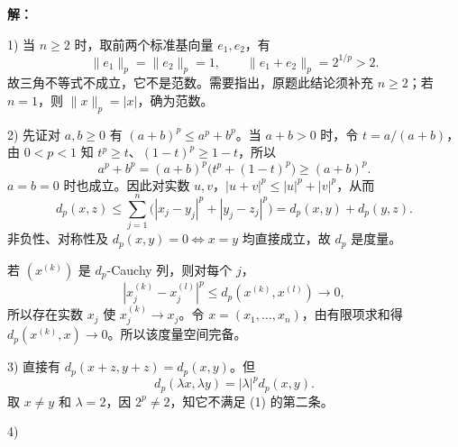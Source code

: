 \documentclass{article}
\begin{document}
\par{}\noindent\textbf{解：}\par\nopagebreak[4]



1) 当 $n\ge2$ 时，取前两个标准基向量 $e_1,e_2$，有
\[
\|e_1\|_p=\|e_2\|_p=1,\qquad
\|e_1+e_2\|_p=2^{1/p}>2.
\]
故三角不等式不成立，它不是范数。需要指出，原题此结论须补充 $n\ge2$；若 $n=1$，则 $\|x\|_p=|x|$，确为范数。

2) 先证对 $a,b\ge0$ 有 $(a+b)^p\le a^p+b^p$。当 $a+b>0$ 时，令 $t=a/(a+b)$，由 $0<p<1$ 知 $t^p\ge t$、$(1-t)^p\ge1-t$，所以
\[
a^p+b^p=(a+b)^p\bigl(t^p+(1-t)^p\bigr)\ge(a+b)^p.
\]
$a=b=0$ 时也成立。因此对实数 $u,v$，$|u+v|^p\le|u|^p+|v|^p$，从而
\[
d_p(x,z)\le\sum_{j=1}^n\bigl(|x_j-y_j|^p+|y_j-z_j|^p\bigr)=d_p(x,y)+d_p(y,z).
\]
非负性、对称性及 $d_p(x,y)=0\iff x=y$ 均直接成立，故 $d_p$ 是度量。

若 $(x^{(k)})$ 是 $d_p$-Cauchy 列，则对每个 $j$，
\[
|x_j^{(k)}-x_j^{(l)}|^p\le d_p(x^{(k)},x^{(l)})\to0,
\]
所以存在实数 $x_j$ 使 $x_j^{(k)}\to x_j$。令 $x=(x_1,\ldots,x_n)$，由有限项求和得 $d_p(x^{(k)},x)\to0$。所以该度量空间完备。

3) 直接有 $d_p(x+z,y+z)=d_p(x,y)$。但
\[
d_p(\lambda x,\lambda y)=|\lambda|^p d_p(x,y).
\]
取 $x\ne y$ 和 $\lambda=2$，因 $2^p\ne2$，知它不满足 (1) 的第二条。

\par\medskip\noindent\begin{minipage}{\linewidth}

4) 

\begin{center}
\end{center}
\end{minipage}


\par\medskip
\end{document}
